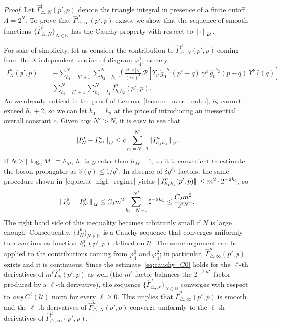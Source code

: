 \documentclass[a4paper, 11pt]{article}
\newcommand{\N}{\mathbb{N}}
\newcommand{\cutoff}{\Lambda}								%
\newcommand{\sing}[2]{{#1}^{#2}}							%
\renewcommand{\phi}{\varphi}								%
\newcommand{\ren}{\mathcal{R}}								%
\newcommand{\floor}[1]{\lfloor #1 \rfloor}					%
\theoremstyle{thm}
\begin{document}
\begin{proof}
Let $\hat{\Gamma}^\mu_{\triangle, N}(p', p)$ denote the triangle integral in presence of a finite cutoff $\cutoff = 2^N$. To prove that $\hat{\Gamma}^\mu_{\triangle, \infty}(p', p)$ exists, we show that the sequence of smooth functions $\lbrace \hat{\Gamma}^\mu_{\triangle, N} \rbrace_{N \in \N}$ has the Cauchy property with respect to $\norm*{\, \cdot \,}_\mathcal{U}$. 

For sake of simplicity, let us consider the contribution to $\hat{\Gamma}^\mu_{\triangle, N}(p', p)$ coming from the $\lambda$-independent version of diagram $\phi_4^1$, namely
\begin{align*}
I_N^\mu(p', p) 
& = - \sum_{h_1 = h^\star + 1}^N \sum_{h_2 = h_1}^N \int \frac{\dd[4]{q}}{(2\pi)^4} \, \ren[\Upsilon_\nu \, \sing{\hat{g}_0}{h_1}(p' - q) \, \gamma^\mu \, \sing{\hat{g}_0}{h_2}(p - q) \, \Upsilon^\nu \, \hat{v}(q)] \\
& = \sum_{h_1 = h^\star + 1}^N \sum_{h_2 = h_1}^N I^\mu_{h_1 h_2}(p', p).
\end{align*}
As we already noticed in the proof of Lemma~\ref{lm:sum_over_scales}, $h_2$ cannot exceed $h_1 + 2$, so we can let $h_1 = h_2$ at the price of introducing an inessential overall constant $c$. Given any $N' > N$, it is easy to see that
\begin{equation}
\norm*{I_N^\mu - I^\mu_{N'}}_\mathcal{U} \le c \sum_{h_1 = N-1}^{N'} \norm*{I^\mu_{h_1 h_1}}_\mathcal{U}.
\end{equation}
If $N \ge \floor{\log_2 M} \equiv h_M$, $h_1$ is greater than $h_M-1$, so it is convenient to estimate the boson propagator as $\hat{v}(q) \le 1/q^2$. In absence of $\sing{\delta g}{h_1}$ factors, the same procedure shown in~\eqref{eq:delta_high_regime} yields $\norm*{I^\mu_{h_1 h_1}(p', p)} \le m^2 \cdot 2^{-2h_1}$, so
\begin{equation}
\label{eq:cauchy_C0}
\norm*{I_N^\mu - I^\mu_{N'}}_\mathcal{U} \le C_1 m^2 \sum_{h_1 = N-1}^{N'} 2^{-2h_1} \le \frac{C_2 m^2}{2^{2N}}.
\end{equation}
The right hand side of this inequality becomes arbitrarily small if $N$ is large enough. Consequently, $\lbrace I^\mu_N \rbrace_{N \in \N}$ is a Cauchy sequence that converges uniformly to a continuous function $I^\mu_{\infty}(p', p)$ defined on $\mathcal{U}$. The same argument can be applied to the contributions coming from $\phi_4^0$ and $\phi_4^2$; in particular, $\hat{\Gamma}^\mu_{\triangle, \infty}(p', p)$ exists and it is continuous. Since the estimate~\eqref{eq:cauchy_C0} holds for the $\ell$-th derivatives of $m^\ell \hat{I}^\mu_N(p', p)$ as well (the $m^\ell$ factor balances the $2^{-\ell h^\star}$ factor produced by a $\ell$-th derivative), the sequence $\lbrace \hat{\Gamma}^\mu_{\triangle, N} \rbrace_{N \in \N}$ converges with respect to \emph{any} $C^\ell(\mathcal{U})$ norm for every $\ell \ge 0$. This implies that $\hat{\Gamma}^\mu_{\triangle, \infty}(p', p)$ is smooth and the $\ell$-th derivatives of $\hat{\Gamma}^\mu_{\triangle, N}(p', p)$ converge uniformly to the $\ell$-th derivatives of $\hat{\Gamma}^\mu_{\triangle, \infty}(p', p)$.


\end{proof}
\end{document}

